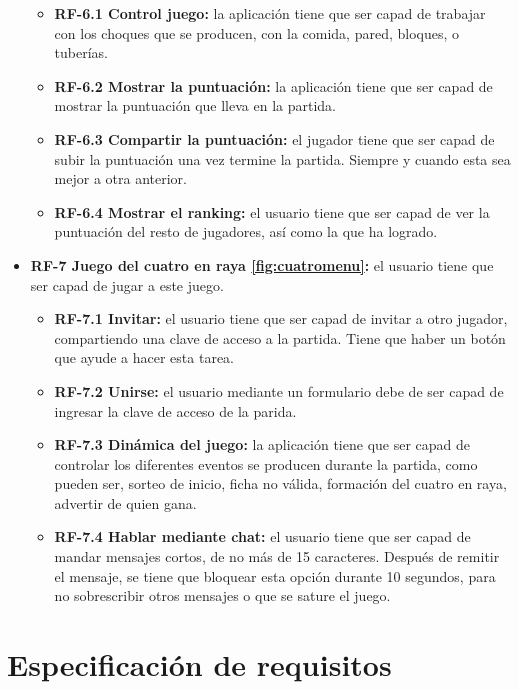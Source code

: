 \begin{itemize}
	\begin{itemize}
		\tightlist
		\item \textbf{RF-6.1 Control juego:} la aplicación tiene que ser capad de trabajar con los choques que se producen, con la comida, pared, bloques, o tuberías.
		\item \textbf{RF-6.2 Mostrar la puntuación:} la aplicación tiene que ser capad de mostrar la puntuación que lleva en la partida.
		\item \textbf{RF-6.3 Compartir la puntuación:} el jugador tiene que ser capad de subir la puntuación una vez termine la partida. Siempre y cuando esta sea mejor a otra anterior.
		\item \textbf{RF-6.4 Mostrar el ranking:} el usuario tiene que ser capad de ver la puntuación del resto de jugadores, así como la que ha logrado.
	\end{itemize}

	\item \textbf{RF-7 Juego del cuatro en raya \ref{fig:cuatromenu}:} el usuario tiene que ser capad de jugar a este juego.
	
	\begin{itemize}
		\tightlist
		\item \textbf{RF-7.1 Invitar:} el usuario tiene que ser capad de invitar a otro jugador, compartiendo una clave de acceso a la partida. Tiene que haber un botón que ayude a hacer esta tarea.
		\item \textbf{RF-7.2 Unirse:} el usuario mediante un formulario debe de ser capad de ingresar la clave de acceso de la parida.
		\item \textbf{RF-7.3 Dinámica del juego:} la aplicación tiene que ser capad de controlar los diferentes eventos se producen durante la partida, como pueden ser, sorteo de inicio, ficha no válida, formación del cuatro en raya, advertir de quien gana.
		\item \textbf{RF-7.4 Hablar mediante chat:} el usuario tiene que ser capad de mandar mensajes cortos, de no más de 15 caracteres. Después de remitir el mensaje, se tiene que bloquear esta opción durante 10 segundos, para no sobrescribir otros mensajes o que se sature el juego.
	\end{itemize}

\end{itemize}


\section{Especificación de requisitos}


